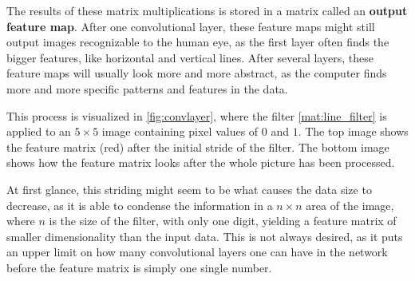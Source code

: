 \documentclass[10pt, twocolumn]{article}
\begin{document}
The results of these matrix multiplications is stored in a matrix called an \textbf{output feature map}. After one convolutional layer, these feature maps might still output images recognizable to the human eye, as the first layer often finds the bigger features, like horizontal and vertical lines. After several layers, these feature maps will usually look more and more abstract, as the computer finds more and more specific patterns and features in the data.

This process is visualized in \cref{fig:convlayer}, where the filter \cref{mat:line_filter} is applied to an $5 \times 5$ image containing pixel values of $0$ and $1$. The top image shows the feature matrix (red) after the initial stride of the filter. The bottom image shows how the feature matrix looks after the whole picture has been processed.

At first glance, this striding might seem to be what causes the data size to decrease, as it is able to condense the information in a $n \times n$ area of the image, where $n$ is the size of the filter, with only one digit, yielding a feature matrix of smaller dimensionality than the input data. This is not always desired, as it puts an upper limit on how many convolutional layers one can have in the network before the feature matrix is simply one single number. 
\end{document}
